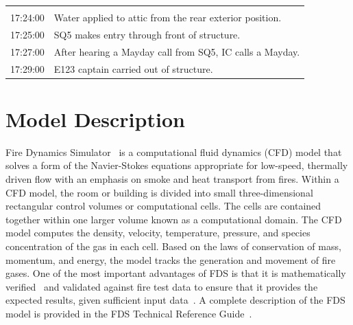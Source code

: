\begin{table}
\begin{tabular}{cl}
                           &                                                                                                                                          \\[.25cm]
17:24:00                   &   Water applied to attic from the rear exterior position.                                                                                \\[.25cm]
17:25:00                   &   SQ5 makes entry through front of structure.                                                                                            \\[.25cm]
17:27:00                   &   After hearing a Mayday call from SQ5, IC calls a Mayday.                                                                               \\[.25cm]
17:29:00                   &   E123 captain carried out of structure.                                                                                                 \\
\bottomrule[1.25pt]
\end{tabular}\par
\end{table}

\section{Model Description}
\label{model}
Fire Dynamics Simulator~\cite{FDS_Users_Guide} is a computational fluid dynamics (CFD) model that solves a form of the Navier-Stokes equations appropriate for low-speed, thermally driven flow with an emphasis on smoke and heat transport from fires.  Within a CFD model, the room or building is divided into small three-dimensional rectangular control volumes or computational cells.  The cells are contained together within one larger volume known as a computational domain.  The CFD model computes the density, velocity, temperature, pressure, and species concentration of the gas in each cell.  Based on the laws of conservation of mass, momentum,  and energy, the model tracks the generation and movement of fire gases. One of the most important advantages of FDS is that it is  mathematically verified~\cite{FDS_Verification_Guide} and validated against fire test data to ensure that it provides the expected results, given sufficient input data~\cite{FDS_Validation_Guide}. A complete description of the FDS model is provided in the FDS Technical Reference Guide~\cite{FDS_Math_Guide}.

